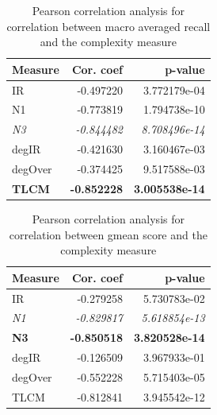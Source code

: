 \documentclass[twoside,leqno,twocolumn]{article}
\begin{document}
\begin{table}[]
    \centering
    \begin{tabular}{lrr}
    \toprule
    Measure &  Cor. coef &      p-value \\
    \midrule
         IR &  -0.497220 & 3.772179e-04 \\
         N1 &  -0.773819 & 1.794738e-10 \\
         \emph{N3} &  \emph{-0.844482} & \emph{8.708496e-14} \\
      degIR &  -0.421630 & 3.160467e-03 \\
    degOver &  -0.374425 & 9.517588e-03 \\
       \textbf{TLCM} &  \textbf{-0.852228} & \textbf{3.005538e-14} \\
    \bottomrule
    \end{tabular}
    \caption{\label{tab:mac_rec}Pearson correlation analysis for correlation between macro averaged recall and the complexity measure}
\end{table}

\begin{table}[]
    \centering
    \begin{tabular}{lrr}
    \toprule
    Measure &  Cor. coef &      p-value \\
    \midrule
         IR &  -0.279258 & 5.730783e-02 \\
        \emph{N1} &  \emph{-0.829817} & \emph{5.618854e-13} \\
        \textbf{N3} &  \textbf{-0.850518} & \textbf{3.820528e-14} \\
        degIR &  -0.126509 & 3.967933e-01 \\
        degOver &  -0.552228 & 5.715403e-05 \\
        TLCM &  -0.812841 & 3.945542e-12 \\
    \bottomrule
    \end{tabular}
    \caption{\label{tab:gmean}Pearson correlation analysis for correlation between gmean score and the complexity measure}
\end{table}
\end{document}
